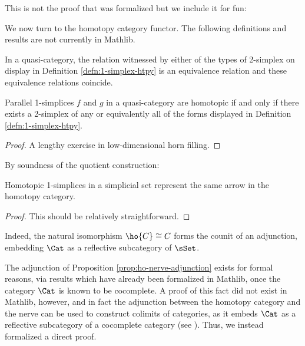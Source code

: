 This is not the proof that was formalized but we include it for fun:



 We now turn to the homotopy category functor. The following definitions and results are not currently in Mathlib.


   In a quasi-category, the relation witnessed by either of the types of 2-simplex on display in Definition \ref{defn:1-simplex-htpy} is an equivalence relation and these equivalence relations coincide.

   \begin{lemma}\label{lem:qcat-1-simplex-htpy}
    Parallel 1-sim\-plices $f$ and $g$ in a quasi-category are homotopic if and only if there exists a 2-simplex of any or equivalently all of the forms displayed in Definition \ref{defn:1-simplex-htpy}.
   \end{lemma}
 \begin{proof}
   A lengthy exercise in low-dimensional horn filling.
   \end{proof}





By soundness of the quotient construction:

\begin{lem}\label{lem:1-simplex-htpy-in-homotopy-cat}
  Homotopic 1-simplices in a simplicial set represent the same arrow in the homotopy category.
\end{lem}
\begin{proof}
This should be relatively straightforward.
\end{proof}




   Indeed, the natural isomorphism $\ho{C} \cong C$ forms the counit of an adjunction, embedding $\Cat$ as a reflective subcategory of $\sSet$.


   The adjunction of Proposition \ref{prop:ho-nerve-adjunction} exists for formal reasons, via results which have already been formalized in Mathlib, %
   once the category $\Cat$ is known to be cocomplete. A proof of this fact did not exist in Mathlib, however, and in fact the adjunction between the homotopy category and the nerve can be used to construct colimits of categories, as it embeds $\Cat$ as a reflective subcategory of a cocomplete category (see \cite[4.5.16]{Riehl:2016cc}). Thus, we instead formalized a direct proof.



